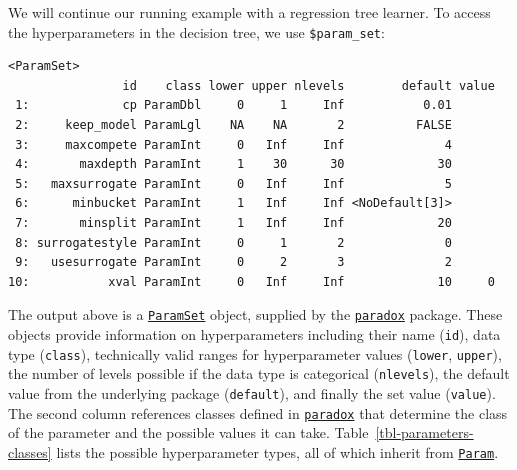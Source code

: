 We will continue our running example with a regression tree learner. To
access the hyperparameters in the decision tree, we use
\texttt{\$param\_set}:

\begin{Shaded}
\begin{Highlighting}[]
\SpecialCharTok{$}
\end{Highlighting}
\end{Shaded}

\begin{verbatim}
<ParamSet>
                id    class lower upper nlevels        default value
 1:             cp ParamDbl     0     1     Inf           0.01      
 2:     keep_model ParamLgl    NA    NA       2          FALSE      
 3:     maxcompete ParamInt     0   Inf     Inf              4      
 4:       maxdepth ParamInt     1    30      30             30      
 5:   maxsurrogate ParamInt     0   Inf     Inf              5      
 6:      minbucket ParamInt     1   Inf     Inf <NoDefault[3]>      
 7:       minsplit ParamInt     1   Inf     Inf             20      
 8: surrogatestyle ParamInt     0     1       2              0      
 9:   usesurrogate ParamInt     0     2       3              2      
10:           xval ParamInt     0   Inf     Inf             10     0
\end{verbatim}

The output above is a
\href{https://paradox.mlr-org.com/reference/ParamSet.html}{\texttt{ParamSet}}
object, supplied by the
\href{https://paradox.mlr-org.com}{\texttt{paradox}} package. These
objects provide information on hyperparameters including their name
(\texttt{id}), data type (\texttt{class}), technically valid ranges for
hyperparameter values (\texttt{lower}, \texttt{upper}), the number of
levels possible if the data type is categorical (\texttt{nlevels}), the
default value from the underlying package (\texttt{default}), and
finally the set value (\texttt{value}). The second column references
classes defined in \href{https://paradox.mlr-org.com}{\texttt{paradox}}
that determine the class of the parameter and the possible values it can
take. Table~\ref{tbl-parameters-classes} lists the possible
hyperparameter types, all of which inherit from
\href{https://paradox.mlr-org.com/reference/Param.html}{\texttt{Param}}.

